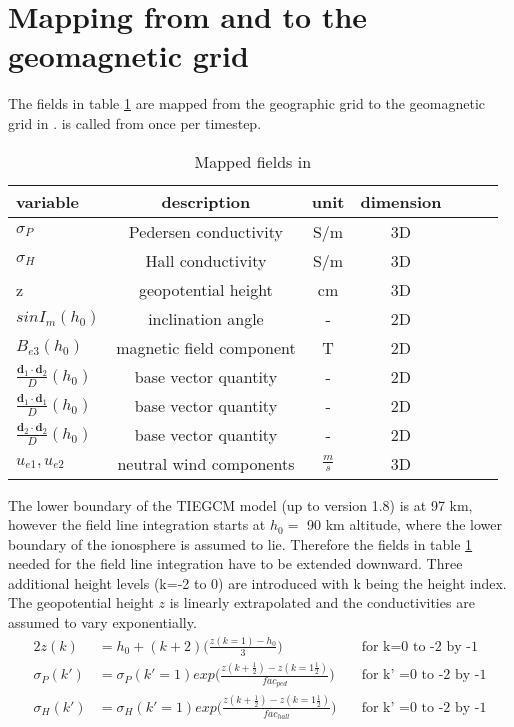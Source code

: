\section{Mapping from and to the geomagnetic grid}
%
The fields in table \ref{tab:map_transf} are mapped from the geographic grid 
to the geomagnetic
grid in .  is called from 
 once per
timestep.
%
\begin{table}[tb]
\begin{tabular}{|p{3.0cm} ||c|c|c|c|c|c|} \hline
 variable                                  & description            & unit & dimension \\ \hline \hline
%
$\sigma_P$                                 & Pedersen conductivity   & S/m & 3D   \\ 
$\sigma_H$                                 & Hall conductivity       & S/m & 3D   \\
z                                          & geopotential height     & cm & 3D   \\ 
$sin I_m(h_0)$                             & inclination angle       & -  & 2D   \\ 
$B_{e3}(h_0)$                                     & magnetic field component    & T  & 2D   \\
$\frac{\mathbf{d}_1 \cdot \mathbf{d}_2}{D}(h_0)$  & base vector quantity	& - &  2D   \\ 
$\frac{\mathbf{d}_1 \cdot \mathbf{d}_1}{D}(h_0)$  & base vector quantity	& - &  2D   \\
$\frac{\mathbf{d}_2 \cdot \mathbf{d}_2}{D}(h_0)$  & base vector quantity	& - &  2D   \\
${u}_{e1}, {u}_{e2} $                     & neutral wind components & $\frac{m}{s}$ & 3D   \\ \hline
%
\end{tabular}
\caption{Mapped fields in }
\label{tab:map_transf}
\end{table}  
%
The lower boundary of the TIEGCM model (up to version 1.8) 
is at 97 km, however the field
line integration starts at $h_0=$ 90 km altitude, where the lower boundary 
of the
ionosphere is assumed to lie. Therefore the fields in table \ref{tab:map_transf} 
needed for the field line integration
have to be
extended downward. 
Three additional height levels (k=-2 to 0) are introduced with k being the
height index. The geopotential height $z$ is linearly
extrapolated and the conductivities are assumed to vary exponentially.
%
\begin{alignat}{2}
  z(k)               &= h_0+(k+2)
                \bigl(\frac{z(k=1)-h_0}{3} \bigr) \quad &\text{for k=0 to -2 by -1}  \\
  {\sigma}_{P}(k')  &= {\sigma}_{P}(k'=1)
                exp \bigl(\frac{z(k+\frac{1}{2})-z(k=1\frac{1}{2})}{ fac_{ped}}
		\bigr)\quad &\text{for k' =0 to -2 by -1} \label{eq:condped_ext}   \\
  {\sigma}_{H}(k') &= {\sigma}_{H}(k'=1)
                exp \bigl(\frac{z(k+\frac{1}{2})-z(k=1\frac{1}{2})}{ fac_{hall}}
		\bigr) \quad &\text{for k' =0 to -2 by -1} \label{eq:condhall_ext}   
\end{alignat}
